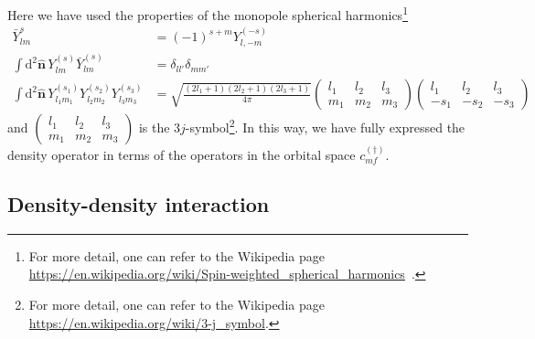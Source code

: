 \documentclass{timesjhep}
\begin{document}
Here we have used the properties of the monopole spherical harmonics\footnote{For more detail, one can refer to the Wikipedia page \url{https://en.wikipedia.org/wiki/Spin-weighted_spherical_harmonics}~\cite{Wu1976LLL}.}
\begin{subequations}
\begin{align}
    \bar{Y}_{lm}^{s}&=(-1)^{s+m}Y_{l,-m}^{(-s)}\\
    \int\mathrm{d}^2\hat{\mathbf{n}}\,Y_{lm}^{(s)}\bar{Y}_{lm}^{(s)}&=\delta_{ll'}\delta_{mm'}\\
    \int\mathrm{d}^2\hat{\mathbf{n}}\,Y_{l_1m_1}^{(s_1)}Y_{l_2m_2}^{(s_2)}Y_{l_3m_3}^{(s_3)}&=\sqrt{\frac{(2l_1+1)(2l_2+1)(2l_3+1)}{4\pi}}\begin{pmatrix}l_1&l_2&l_3\\m_1&m_2&m_3\end{pmatrix}\begin{pmatrix}l_1&l_2&l_3\\-s_1&-s_2&-s_3\end{pmatrix}     
\end{align} 
\end{subequations}
and $\begin{pmatrix}l_1&l_2&l_3\\m_1&m_2&m_3\end{pmatrix}$ is the $3j$-symbol\footnote{For more detail, one can refer to the Wikipedia page \url{https://en.wikipedia.org/wiki/3-j_symbol}.}. In this way, we have fully expressed the density operator in terms of the operators in the orbital space $c^{(\dagger)}_{mf}$. 

\subsection{Density-density interaction}
\label{sec:construct_denint}
\end{document}
